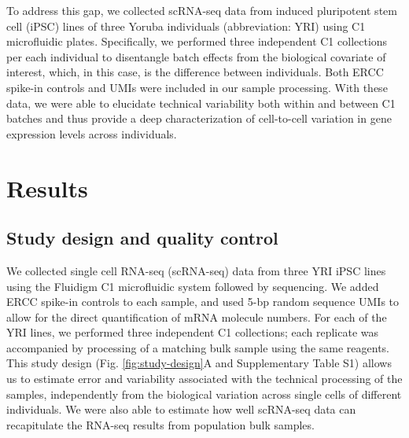 To address this gap, we collected scRNA-seq data from induced
pluripotent stem cell (iPSC) lines of three Yoruba individuals
(abbreviation: YRI) using C1 microfluidic plates. Specifically, we
performed three independent C1 collections per each individual to
disentangle batch effects from the biological covariate of interest,
which, in this case, is the difference between individuals. Both ERCC
spike-in controls and UMIs were included in our sample processing. With
these data, we were able to elucidate technical variability both within
and between C1 batches and thus provide a deep characterization of
cell-to-cell variation in gene expression levels across individuals.

\section{Results}\label{results}

\subsection{Study design and quality
control}\label{study-design-and-quality-control}

We collected single cell RNA-seq (scRNA-seq) data from three YRI iPSC
lines using the Fluidigm C1 microfluidic system followed by sequencing.
We added ERCC spike-in controls to each sample, and used 5-bp random
sequence UMIs to allow for the direct quantification of mRNA molecule
numbers. For each of the YRI lines, we performed three independent C1
collections; each replicate was accompanied by processing of a matching
bulk sample using the same reagents. This study design (Fig. \ref{fig:study-design}A and
Supplementary Table S1) allows us to estimate error and variability
associated with the technical processing of the samples, independently
from the biological variation across single cells of different
individuals. We were also able to estimate how well scRNA-seq data can
recapitulate the RNA-seq results from population bulk samples.

